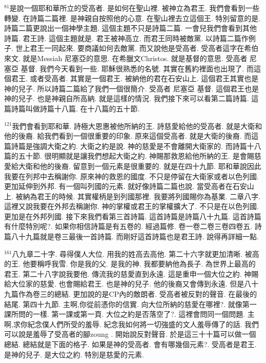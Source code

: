 \documentclass{book}
\begin{document}
$^{81}$是說一個耶和華所立的受高者.
是如何在聖山裡.
被神立為君王.
我們會看到一些轉變.
在詩篇二篇裡.
是神親自按照他的心意.
在聖山裡去立這個王.
特別留意的是.
詩篇二篇更說出一個神學主題.
這個主題不只是詩篇二篇.
一會兒我們會看到其他詩篇.
君王詩.
這個主題就是.
君王被神高立.
而君王同時被敵黨.
以詩篇二篇作例子.
世上君王一同起來.
要商議如何去敵黨.
而又說他是受高者.
受高者這字在希伯來文.
就是Messiah 尼塞亞的意思.
在希臘文Christos.
就是基督的意思.
受高者 尼塞亞 基督.
我們今天看到一些.
耶穌很熟悉的名號.
其實在舊約裡面也出現了.
而這個君王.
或者受高者.
其實是一個君王.
被納他的君在石安山上.
這個君王其實也是神的兒子.
所以詩篇二篇給了我們一個很簡介.
受高者 尼塞亞 基督.
這個君王也是神的兒子.
也是神親自所高納.
就是這樣的情況.
我們接下來可以看第二篇詩篇.
這篇詩篇叫做詩篇十八篇.
在十八篇的五十節.

$^{121}$我們會看到耶和華.
詩極大恩惠被他所納的王.
詩慈愛給他的受高者.
就是大衛和他的後裔.
給我們看到一個很重要的印象.
原來這個受高者.
就是大衛的後裔.
而這篇詩篇是強調大衛之約.
大衛之約是說.
神的慈愛是不會離開大衛家的.
而詩篇十八篇的五十節.
很明顯就是讓我們想起大衛之約.
神賜那救恩給他所納的王.
是會賜慈愛給大衛和他的後裔.
留意到一個元素是很重要的.
就是在四十九節.
耶和華說因此我要在列邦中去稱謝你.
原來神的救恩的國度.
不只是停留在大衛家或者以色列國.
更加延伸到外邦.
有一個叫列國的元素.
就好像詩篇二篇也說.
當受高者在石安山上.
被納為君王的時候.
其實權柄是到列國那裡.
我要將列國賜你為基業.
二章八字.
這裡又說我要在外邦去稱謝你.
神的掌權或君王的掌權擴大了.
不只是在以色列國.
更加是在外邦列國.
接下來我們看第三首詩篇.
這首詩篇是詩篇八十九篇.
這首詩篇有什麼特別呢?.
如果你相信詩篇是有五卷的.
經過篇修.
卷一卷二卷三卷四卷五.
詩篇八十九篇就是卷三最後一首詩篇.
而剛好這首詩篇也是君王詩.
說得再詳細一點.

$^{161}$八九章二十字.
尋得僕人大位.
用我的姓高去高他.
第二十六字就更加清晰.
被高的王.
他要稱呼我雪.
你是我的父.
是我的神.
我都要納他為長子.
為世界上最高的君王.
第二十八字說我要他.
傳流我的慈愛直到永遠.
這是重申一個大位之約.
神賜給大位家的慈愛.
也會賜給君王.
也是神的兒子.
他的後裔又會傳到永遠.
但是八十九篇作為卷三的總結.
更加說的是CP內的敵朗者.
受高者被反對的聲音.
在最後的結尾.
第四十九節.
主啊,你從前憑你的信實.
向大位所納的慈愛在哪裡?.
就像第一課所問的一樣.
第一課或第一頁.
大位之約是否落空了?.
這裡會問同一個問題.
主啊,求你紀念僕人們所受的羞辱.
紀念我如何將一切強盛的文人羞辱傳了的話.
我們可以說是羞辱了受高者的腳zoung .
開始說反對聲音.
於是這三十十篇可以做一個總結.
總結就是下面的格子.
如果是神的受高者.
會有哪幾個元素?.
受高者是君王.
是神的兒子.
是大位之約.
特別是慈愛的元素.
\end{document}
